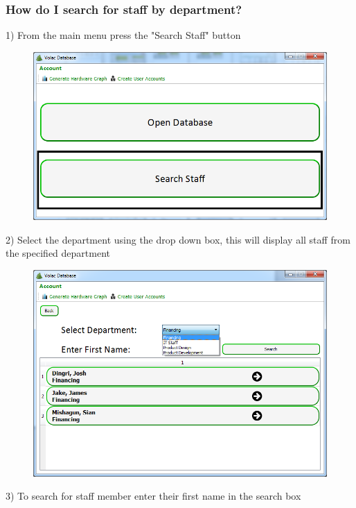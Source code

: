 \subsubsection{How do I search for staff by department?}

1) From the main menu press the "Search Staff" button

\begin{figure}[H]
    \includegraphics[width=\textwidth]{./Manual/Images/searchdep.png}
\end{figure}

2) Select the department using the drop down box, this will display all staff from the specified department

\begin{figure}[H]
    \includegraphics[width=\textwidth]{./Manual/Images/searchdep2.png}
\end{figure}

3) To search for staff member enter their first name in the search box

